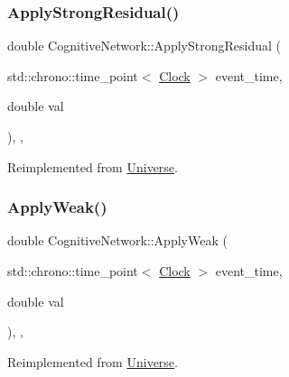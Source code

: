 \subsubsection{\texorpdfstring{Apply\+Strong\+Residual()}{ApplyStrongResidual()}}
{\footnotesize\ttfamily double Cognitive\+Network\+::\+Apply\+Strong\+Residual (\begin{DoxyParamCaption}\item[{std\+::chrono\+::time\+\_\+point$<$ \mbox{\hyperlink{universe_8h_a0ef8d951d1ca5ab3cfaf7ab4c7a6fd80}{Clock}} $>$}]{event\+\_\+time,  }\item[{double}]{val }\end{DoxyParamCaption})\hspace{0.3cm}{\ttfamily [inline]}, {\ttfamily [final]}, {\ttfamily [virtual]}}



Reimplemented from \mbox{\hyperlink{classUniverse_af7becebb347be9a85541d96a3eca1ca7}{Universe}}.

\mbox{\label{classCognitiveNetwork_a46a15b24bd61049fa1c4f635268086a1}} 
\subsubsection{\texorpdfstring{Apply\+Weak()}{ApplyWeak()}}
{\footnotesize\ttfamily double Cognitive\+Network\+::\+Apply\+Weak (\begin{DoxyParamCaption}\item[{std\+::chrono\+::time\+\_\+point$<$ \mbox{\hyperlink{universe_8h_a0ef8d951d1ca5ab3cfaf7ab4c7a6fd80}{Clock}} $>$}]{event\+\_\+time,  }\item[{double}]{val }\end{DoxyParamCaption})\hspace{0.3cm}{\ttfamily [inline]}, {\ttfamily [final]}, {\ttfamily [virtual]}}



Reimplemented from \mbox{\hyperlink{classUniverse_a6d1226b3adec3c42a833afdbb6a65a92}{Universe}}.

\mbox{\label{classCognitiveNetwork_ab8bc213d2806f0dc49c1284bf934fc24}} 
